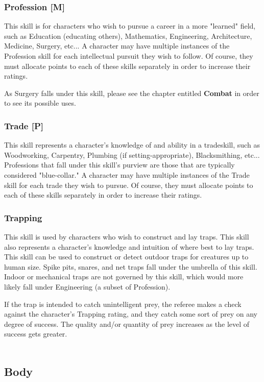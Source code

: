 \documentclass[oneside]{book}
\begin{document}
\begin{multicols}{2}
\subsubsection{Profession [M]}
This skill is for characters who wish to pursue a career in a more "learned" field, such as Education (educating others), Mathematics, Engineering, Architecture, Medicine, Surgery, etc... A character may have multiple instances of the Profession skill for each intellectual pursuit they wish to follow. Of course, they must allocate points to each of these skills separately in order to increase their ratings. 

As Surgery falls under this skill, please see the chapter entitled \textbf{Combat} in order to see its possible uses. 


\subsubsection{Trade [P]}
This skill represents a character's knowledge of and ability in a tradeskill, such as Woodworking, Carpentry, Plumbing (if setting-appropriate), Blacksmithing, etc... Professions that fall under this skill's purview are those that are typically considered "blue-collar."  A character may have multiple instances of the Trade skill for each trade they wish to pursue. Of course, they must allocate points to each of these skills separately in order to increase their ratings. 

\subsubsection{Trapping}
This skill is used by characters who wish to construct and lay traps. This skill also represents a character's knowledge and intuition of where best to lay traps. This skill can be used to construct or detect outdoor traps for creatures up to human size. Spike pits, snares, and net traps fall under the umbrella of this skill. Indoor or mechanical traps are not governed by this skill, which would more likely fall under Engineering (a subset of Profession).

If the trap is intended to catch unintelligent prey, the referee makes a check against the character's Trapping rating, and they catch some sort of prey on any degree of success. The quality and/or quantity of prey increases as the level of success gets greater. 
\\
\\
\subsection{Body}

\end{multicols}
\end{document}
